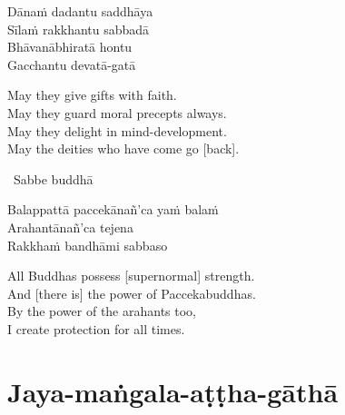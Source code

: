 \begin{pali-hang-continued}
  Dānaṁ dadantu saddhāya\\
  Sīlaṁ rakkhantu sabbadā\\
  Bhāvanābhiratā hontu\\
  Gacchantu devatā-gatā
\end{pali-hang-continued}

\begin{english-verses}
  May they give gifts with faith.\\
  May they guard moral precepts always.\\
  May they delight in mind-development.\\
  May the deities who have come go [back].
\end{english-verses}

\begin{leader-only}
  \anglebracketleft\ \hspace{-0.5mm}Sabbe buddhā \hspace{-0.5mm}\anglebracketright\
\end{leader-only}

\vspace{-0.99em}

\begin{pali-hang-continued}
  Balappattā paccekānañ'ca yaṁ balaṁ\\
  Arahantānañ'ca tejena\\
  Rakkhaṁ bandhāmi sabbaso
\end{pali-hang-continued}

\begin{english-verses}
  All Buddhas possess [supernormal] strength.\\
  And [there is] the power of Paccekabuddhas.\\
  By the power of the arahants too,\\
  I create protection for all times.
\end{english-verses}

\suttaRef{[MJG]}

\section{Jaya-maṅgala-aṭṭha-gāthā}
\label{jaya-mangala-attha-gatha}

